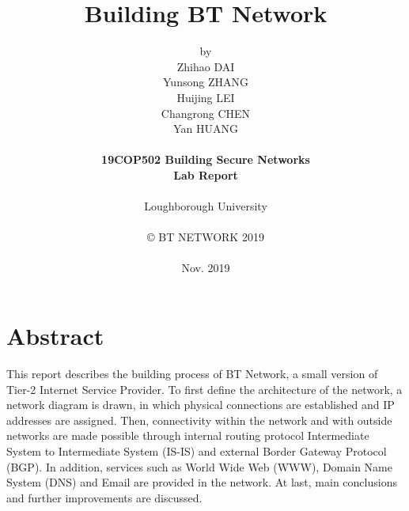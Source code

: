 \title{\bf Building BT Network}

\author{by\\
Zhihao DAI\\
Yunsong ZHANG\\
Huijing LEI\\
Changrong CHEN\\
Yan HUANG\\
\\
{\bf 19COP502 Building Secure Networks}\\
{\bf Lab Report}\\
\\
Loughborough University\\
\\
\copyright
\hspace{1 dd} BT NETWORK 2019\\
\\
Nov. 2019
}
\date{} %

\maketitle


% 
% 

\chapter*{Abstract}
This report describes the building process of BT Network, a small version of Tier-2 Internet Service Provider.
To first define the architecture of the network, a network diagram is drawn, in which physical connections are established and IP addresses are assigned. 
Then, connectivity within the network and with outside networks are made possible through internal routing protocol Intermediate System to Intermediate System (IS-IS) and external Border Gateway Protocol (BGP).
In addition, services such as World Wide Web (WWW), Domain Name System (DNS) and Email are provided in the network.
At last, main conclusions and further improvements are discussed.

